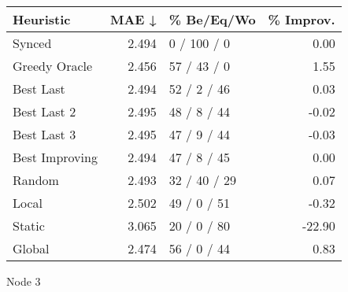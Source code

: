 \begin{tabular}{lrlr}
\toprule
\textbf{Heuristic} & \textbf{MAE ↓} & \textbf{\% Be/Eq/Wo} & \textbf{\% Improv.} \\
\midrule
            Synced &          2.494 &          0 / 100 / 0 &                0.00 \\
     Greedy Oracle &          2.456 &          57 / 43 / 0 &                1.55 \\
         Best Last &          2.494 &          52 / 2 / 46 &                0.03 \\
       Best Last 2 &          2.495 &          48 / 8 / 44 &               -0.02 \\
       Best Last 3 &          2.495 &          47 / 9 / 44 &               -0.03 \\
    Best Improving &          2.494 &          47 / 8 / 45 &                0.00 \\
            Random &          2.493 &         32 / 40 / 29 &                0.07 \\
             Local &          2.502 &          49 / 0 / 51 &               -0.32 \\
            Static &          3.065 &          20 / 0 / 80 &              -22.90 \\
            Global &          2.474 &          56 / 0 / 44 &                0.83 \\
\bottomrule
\end{tabular}
\caption{Node 3}
\label{tab:hr_iid_lr01_le1_bs2_3}
